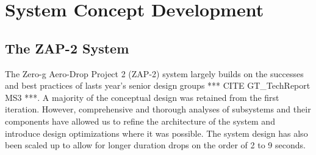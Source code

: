 \section{System Concept Development}

\subsection{The ZAP-2 System}

\indent\indent The Zero-g Aero-Drop Project 2 (ZAP-2) system largely builds on the successes and best practices of lasts year's senior design groups *** CITE GT\_TechReport MS3 ***. A majority of the conceptual design was retained from the first iteration. However, comprehensive and thorough analyses of subsystems and their components have allowed us to refine the architecture of the system and introduce design optimizations where it was possible. The system design has also been scaled up to allow for longer duration drops on the order of 2 to 9 seconds.

